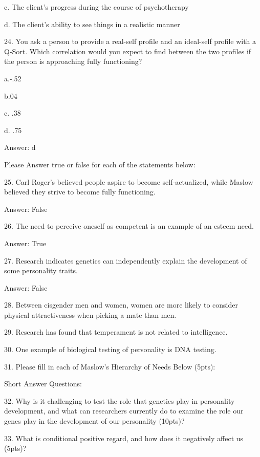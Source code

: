 \documentclass{article}
\begin{document}
c. The client's progress during the course of psychotherapy

d. The client's ability to see things in a realistic manner

24. You ask a person to provide a real-self profile and an ideal-self profile with a Q-Sort. Which correlation would you expect to find between the two profiles if the person is approaching fully functioning?

a.-.52

b.04

c. .38

d. .75

Answer: d

Please Answer true or false for each of the statements below:

25. Carl Roger's believed people aspire to become self-actualized, while Maslow believed they strive to become fully functioning.

Answer: False

26. The need to perceive oneself as competent is an example of an esteem need.

Answer: True


27. Research indicates genetics can independently explain the development of some personality traits.

Answer: False

28. Between cisgender men and women, women are more likely to consider physical attractiveness when picking a mate than men.

29. Research has found that temperament is not related to intelligence.

30. One example of biological testing of personality is DNA testing.

31. Please fill in each of Maslow's Hierarchy of Needs Below (5pts):

Short Answer Questions:

32. Why is it challenging to test the role that genetics play in personality development, and what can researchers currently do to examine the role our genes play in the development of our personality (10pts)?

33. What is conditional positive regard, and how does it negatively affect us (5pts)?
\end{document}
